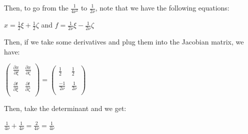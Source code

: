 \documentclass[executivepaper]{article}
\begin{document}
\begin{flushleft}
\begin{center}
Then, to go from the $\frac{1}{4\nu^2}$ to $\frac{1}{2\nu}$, note that we have the following equations:

\vspace{3mm}

$x=\frac{1}{2} \xi + \frac{1}{2} \zeta$ and $f=\frac{1}{2\nu} \xi - \frac{1}{2\nu} \zeta$

\vspace{3mm}

Then, if we take some derivatives and plug them into the Jacobian matrix, we have:

\vspace{3mm}

$ \begin{pmatrix}
  \frac{\partial x}{\partial \xi} & \frac{\partial x}{\partial \zeta} \\
  
  		&\\
  
\frac{\partial t}{\partial \xi} & \frac{\partial t}{\partial \zeta}\\
 \end{pmatrix}=\begin{pmatrix}
  \frac{1}{2} & \frac{1}{2} \\
  
  		&\\
  
\frac{-1}{2\nu} & \frac{1}{2\nu}\\
 \end{pmatrix}$
 
\pagebreak

\vspace*{-40mm}
 
 Then, take the determinant and we get:
 
 \vspace{3mm}
 
$\frac{1}{4\nu} +  \frac{1}{4\nu}=\frac{2}{4\nu}=\frac{1}{4\nu}$

\end{center}

\end{flushleft}
\end{document}
